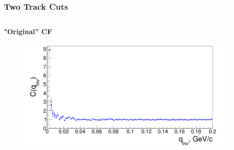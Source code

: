 \documentclass[dvipsnames] {beamer}
\begin{document}
\begin{frame}
  \bf
  \frametitle{\bf \centering Two Track Cuts}
  \begin{columns}[c]
     \begin{block}{\bf \centering "Original'' CF}
       \begin{figure}[H]
        \includegraphics[width=1.\textwidth]{origCF_wo_suppression.png}
       \end{figure}
     \end{block}


\end{columns}
\end{frame}
\end{document}
